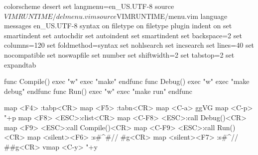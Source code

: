 colorscheme desert
set langmenu=en_US.UTF-8
source $VIMRUNTIME/delmenu.vim
source $VIMRUNTIME/menu.vim
language messages en_US.UTF-8
syntax on
filetype on
filetype plugin indent on
set smartindent
set autochdir
set autoindent
set smartindent
set backspace=2
set columns=120
set foldmethod=syntax
set nohlsearch
set incsearch
set lines=40
set nocompatible
set noswapfile
set number
set shiftwidth=2
set tabstop=2
set expandtab

func Compile()
	exec "w"
	exec "make"
endfunc
func Debug()
	exec "w"
	exec "make debug"
endfunc
func Run()
	exec "w"
	exec "make run"
endfunc

map <F4> :tabp<CR>
map <F5> :tabn<CR>
map <C-a> ggVG
map <C-p> "+p
map <F8> <ESC>:clist<CR>
map <C-F8> <ESC>:call Debug()<CR>
map <F9> <ESC>:call Compile()<CR>
map <C-F9> <ESC>:call Run()<CR>
map <silent><F6> :s#^#// #g<CR>
map <silent><F7> :s#^// ##g<CR>
vmap <C-y> "+y
